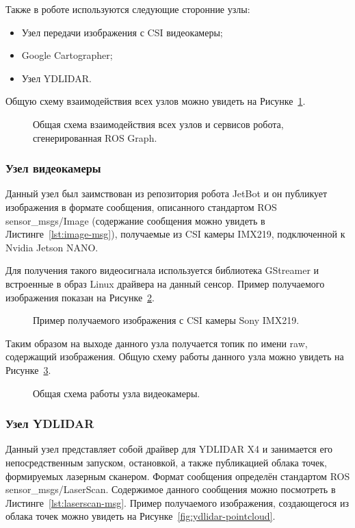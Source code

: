 Также в роботе используются следующие сторонние узлы:
\begin{itemize}
\item Узел передачи изображения с CSI видеокамеры;
\item Google Cartographer;
\item Узел YDLIDAR.
\end{itemize}


Общую схему взаимодействия всех узлов можно увидеть на Рисунке~\ref{fig:rosgraph}.

\begin{figure}[ht]
  \caption{Общая схема взаимодействия всех узлов и сервисов робота, сгенерированная ROS Graph.}\label{fig:rosgraph}
\end{figure}

\subsubsection{Узел видеокамеры}
Данный узел был заимствован из репозитория робота JetBot и он публикует изображения в формате сообщения, описанного стандартом ROS sensor\_msgs/Image (содержание сообщения можно увидеть в Листинге~\ref{lst:image-msg}), получаемые из CSI камеры IMX219, подключенной к Nvidia Jetson NANO. 

Для получения такого видеосигнала используется библиотека GStreamer и встроенные в образ Linux драйвера на данный сенсор. Пример получаемого изображения показан на Рисунке~\ref{fig:robot-camera-test}.

\begin{figure}[ht]
  \caption{Пример получаемого изображения с CSI камеры Sony IMX219.}\label{fig:robot-camera-test}
\end{figure}

Таким образом на выходе данного узла получается топик по имени raw, содержащий изображения. Общую схему работы данного узла можно увидеть на Рисунке~\ref{fig:node-videocamera}.

\begin{figure}[ht]
  \caption{Общая схема работы узла видеокамеры.}\label{fig:node-videocamera}
\end{figure}

\subsubsection{Узел YDLIDAR}
Данный узел представляет собой драйвер для YDLIDAR X4 и занимается его непосредственным запуском, остановкой, а также публикацией облака точек, формируемых лазерным сканером. Формат сообщения определён стандартом ROS sensor\_msgs/LaserScan.  Содержимое данного сообщения можно посмотреть в Листинге~\ref{lst:laserscan-msg}. Пример получаемого изображения, создающегося из облака точек можно увидеть на Рисунке~\ref{fig:ydlidar-pointcloud}. 


